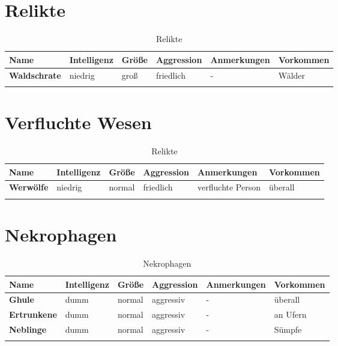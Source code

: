 \section{Relikte}
\begin{longtable}{|l|l|l|l|l|l|}
\hline
\textbf{Name} & \textbf{Intelligenz} & \textbf{Größe} & \textbf{Aggression} & \textbf{Anmerkungen} & \textbf{Vorkommen} \\ \hline

\textbf{Waldschrate} & niedrig & groß & friedlich & - & Wälder \\ \hline

\caption{Relikte}
\label{tab:Relikte}
\end{longtable}


\section{Verfluchte Wesen}
\begin{longtable}{|l|l|l|l|l|l|}
\hline
\textbf{Name} & \textbf{Intelligenz} & \textbf{Größe} & \textbf{Aggression} & \textbf{Anmerkungen} & \textbf{Vorkommen} \\ \hline

\textbf{Werwölfe} & niedrig & normal & friedlich & verfluchte Person & überall \\ \hline

\caption{Relikte}
\label{tab:Relikte}
\end{longtable}


\section{Nekrophagen}
\begin{longtable}{|l|l|l|l|l|l|}
\hline
\textbf{Name} & \textbf{Intelligenz} & \textbf{Größe} & \textbf{Aggression} & \textbf{Anmerkungen} & \textbf{Vorkommen} \\ \hline

\textbf{Ghule} & dumm & normal & aggressiv & - & überall \\ \hline
\textbf{Ertrunkene} & dumm & normal & aggressiv & - & an Ufern \\ \hline
\textbf{Neblinge} & dumm & normal & aggressiv & - & Sümpfe \\ \hline

\caption{Nekrophagen}
\label{tab:Nekrophagen}
\end{longtable}


